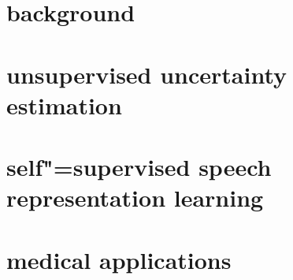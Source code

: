 \documentclass[\classfontsize,\papersize,twoside,showtrims,extrafontsizes]{memoir}  %
\begin{document}
\prefrontmatter

\cleartoevenpage

\cleartooddpage

\cleartoevenpage

\frontmatter





% 




\clearforchapter
\tableofcontents*

\clearforchapter
\mylistoftodos

\mainmatter

\part[background]{background}\label{part:background}




\part[unsupervised uncertainty estimation]{unsupervised uncertainty estimation}\label{part:unsupervised-uncertainty-estimation}



\part[self"=supervised speech representation learning]{self"=supervised speech representation learning}\label{part:self"=supervised-speech-representation-learning}


\part[medical applications]{medical applications}\label{part:medical-applications}


\end{document}
